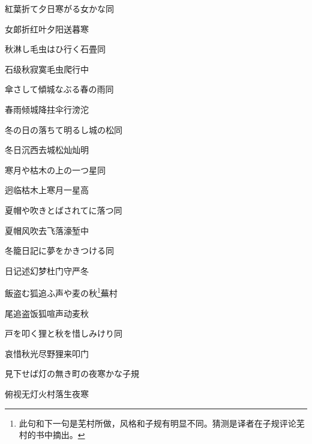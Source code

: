\begin{haiku}
    {\FH 紅葉折て夕日寒がる女かな}\hfill{\FH 同}

    {\FK 女郞折红叶夕阳送暮寒}
\end{haiku}

\begin{haiku}
    {\FH 秋淋し毛虫はひ行く石畳}\hfill{\FH 同}

    {\FK 石级秋寂寞毛虫爬行中}
\end{haiku}

\begin{haiku}
    {\FH 傘さして傾城なぶる春の雨}\hfill{\FH 同}

    {\FK 春雨倾城降拄伞行滂沱}
\end{haiku}

\begin{haiku}
    {\FH 冬の日の落ちて明るし城の松}\hfill{\FH 同}

    {\FK 冬日沉西去城松灿灿明}
\end{haiku}

\begin{haiku}
    {\FH 寒月や枯木の上の一つ星}\hfill{\FH 同}

    {\FK 迥临枯木上寒月一星高}
\end{haiku}

\begin{haiku}
    {\FH 夏帽や吹きとばされてに落つ}\hfill{\FH 同}

    {\FK 夏帽风吹去飞落濠堑中}
\end{haiku}

\begin{haiku}
    {\FH 冬籠日記に夢をかきつける}\hfill{\FH 同}

    {\FK 日记述幻梦杜门守严冬}
\end{haiku}

\begin{haiku}
    {\FH 飯盗む狐追ふ声や麦の秋\footnote{\FT 此句和下一句是芜村所做，风格和子规有明显不同。猜测是译者在子规评论芜村的书中摘出。}}\hfill{\FH 蕪村}

    {\FK 尾追盗饭狐喧声动麦秋}
\end{haiku}

\begin{haiku}
    {\FH 戸を叩く狸と秋を惜しみけり}\hfill{\FH 同}

    {\FK 哀惜秋光尽野狸来叩门}
\end{haiku}

\begin{haiku}
    {\FH 見下せば灯の無き町の夜寒かな}\hfill{\FH 子規}

    {\FK 俯视无灯火村落生夜寒}
\end{haiku}

